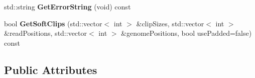 \begin{DoxyCompactItemize}
\item 
\hypertarget{structBamTools_1_1BamAlignment_ae2dccbe73e8588106c8fcbe517ef2397}{std\-::string {\bfseries Get\-Error\-String} (void) const }\label{structBamTools_1_1BamAlignment_ae2dccbe73e8588106c8fcbe517ef2397}

\item 
\hypertarget{structBamTools_1_1BamAlignment_ac63b772b2b979763830a789ecbe97809}{bool {\bfseries Get\-Soft\-Clips} (std\-::vector$<$ int $>$ \&clip\-Sizes, std\-::vector$<$ int $>$ \&read\-Positions, std\-::vector$<$ int $>$ \&genome\-Positions, bool use\-Padded=false) const }\label{structBamTools_1_1BamAlignment_ac63b772b2b979763830a789ecbe97809}

\end{DoxyCompactItemize}
\subsection*{Public Attributes}
